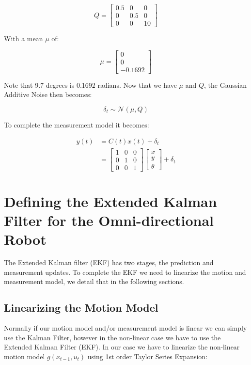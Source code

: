 \documentclass{article}
\begin{document}
\begin{equation}
	Q = 
	\begin{bmatrix}
		0.5 & 0 & 0 \\
		0 & 0.5 & 0 \\
		0 & 0 & 10		
	\end{bmatrix}
\end{equation}

With a mean $\mu$ of:

\begin{equation}
	\mu = 
	\begin{bmatrix}
		0 \\
		0 \\
		-0.1692 
	\end{bmatrix}
\end{equation}

Note that 9.7 degrees is 0.1692 radians. Now that we have $\mu$ and $Q$, the 
Gaussian Additive Noise then becomes:

\begin{equation}
	\delta_{t} \sim \mathcal{N} (\mu, Q)
\end{equation}

To complete the measurement model it becomes:

\begin{align}
	y(t) &= C(t) x(t) + \delta_{t} \\
	&=
	\begin{bmatrix}
		1 & 0 & 0 \\
		0 & 1 & 0 \\
		0 & 0 & 1
	\end{bmatrix}
	\begin{bmatrix}
		x \\
		y \\
		\theta 
	\end{bmatrix}
	+
	\delta_{t}
\end{align}




\newpage
\section{Defining the Extended Kalman Filter for the Omni-directional Robot}
\label{sec:ekf_defintion}

The Extended Kalman filter (EKF) has two stages, the prediction and measurement 
updates. To complete the EKF we need to linearize the motion and measurement 
model, we detail that in the following sections.

\subsection{Linearizing the Motion Model}
\label{subsec:ekf_motion_model_linearization}
Normally if our motion model and/or measurement model is linear we can simply 
use the Kalman Filter, however in the non-linear case we have to use the 
Extended Kalman Filter (EKF). In our case we have to linearize the non-linear 
motion model $g(x_{t-1}, u_{t})$ using 1st order Taylor Series Expansion:
\end{document}
